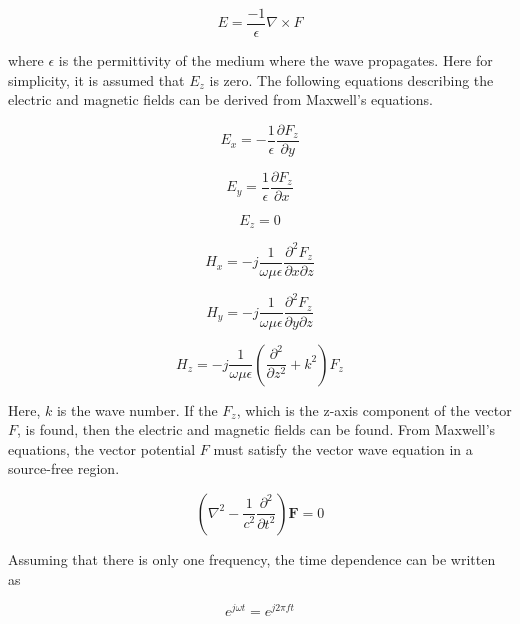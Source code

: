 \documentclass[a4paper,12pt]{report}
\begin{document}
\begin{equation}
  E = \frac{-1}{\epsilon}\nabla \times F
\end{equation}

where $\epsilon$ is the permittivity of the medium where the wave propagates.
Here for simplicity, it is assumed that $E_z$ is zero.
The following equations describing the electric and magnetic fields can be derived from Maxwell's equations.

\begin{equation}
  E_x = -\frac{1}{\epsilon}\frac{\partial F_z}{\partial y}
\end{equation}

\begin{equation}
  E_y = \frac{1}{\epsilon}\frac{\partial F_z}{\partial x}
\end{equation}

\begin{equation}
  E_z = 0
\end{equation}

\begin{equation}
  H_x = -j\frac{1}{\omega\mu\epsilon}\frac{\partial^2F_z}{\partial x \partial z}
\end{equation}

\begin{equation}
  H_y = -j\frac{1}{\omega\mu\epsilon}\frac{\partial^2F_z}{\partial y \partial z}
\end{equation}

\begin{equation}
  H_z = -j\frac{1}{\omega\mu\epsilon}(\frac{\partial^2}{\partial z^2} + k^2)F_z
\end{equation}

Here, $k$ is the wave number.
If the $F_z$, which is the z-axis component of the vector $F$, is found,
then the electric and magnetic fields can be found.
From Maxwell's equations, the vector potential $F$ must satisfy the vector wave equation
in a source-free region.

\begin{equation} \label{eq:vector_wave_equation}
  (\nabla^2 - \frac{1}{c^2}\frac{\partial^2}{\partial t^2})\boldsymbol{F} = 0
\end{equation}

Assuming that there is only one frequency, the time dependence can be written as

\begin{equation}
  e^{j\omega t} = e^{j 2\pi ft}
\end{equation}
\end{document}
